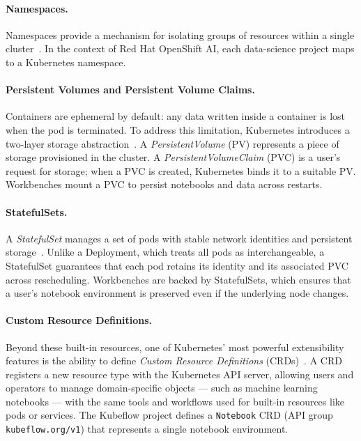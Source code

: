 \documentclass[
  digital,     %
  oneside,     %
  nosansbold,  %
  nocolorbold, %
  lof,         %
  lot,         %
]{fithesis4}
\begin{document}
\paragraph{Namespaces.}
Namespaces provide a mechanism for isolating groups of resources within a single
cluster~\parencite{kubernetes-namespaces}. In the context of Red Hat OpenShift
AI, each data-science project maps to a Kubernetes namespace.

\paragraph{Persistent Volumes and Persistent Volume Claims.}
Containers are ephemeral by default: any data written inside a container is lost
when the pod is terminated. To address this limitation, Kubernetes introduces a
two-layer storage abstraction~\parencite{kubernetes-pv}. A \emph{PersistentVolume} (PV)
represents a piece of storage provisioned in the cluster. A
\emph{PersistentVolumeClaim} (PVC) is a user's request for storage; when a PVC
is created, Kubernetes binds it to a suitable PV. Workbenches mount a
PVC to persist notebooks and data across restarts.

\paragraph{StatefulSets.}
A \emph{StatefulSet} manages a set of pods with stable network identities and
persistent storage~\parencite{kubernetes-statefulsets}. Unlike a Deployment,
which treats all pods as interchangeable, a StatefulSet guarantees that each pod
retains its identity and its associated PVC across rescheduling. Workbenches are
backed by StatefulSets, which ensures that a user's notebook environment is
preserved even if the underlying node changes.

\paragraph{Custom Resource Definitions.}
Beyond these built-in resources, one of Kubernetes' most powerful extensibility
features is the ability to define \emph{Custom Resource Definitions}
(CRDs)~\parencite{kubernetes-crd}. A CRD registers a new resource type with
the Kubernetes API server, allowing users and operators to manage
domain-specific objects --- such as machine learning notebooks --- with the same
tools and workflows used for built-in resources like pods or services. The
Kubeflow project defines a \texttt{Notebook} CRD (API group
\texttt{kubeflow.org/v1}) that represents a single notebook environment.
\end{document}
